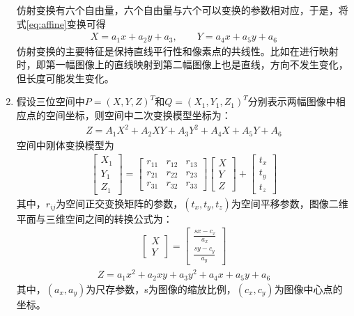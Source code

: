 \begin{enumerate}
仿射变换有六个自由量，六个自由量与六个可以变换的参数相对应，于是，将式\ref{eq:affine}变换可得
\begin{align}
X = a_1x + a_2y + a_3, 
\qquad
Y = a_4x + a_5y + a_6
\end{align}
仿射变换的主要特征是保持直线平行性和像素点的共线性。比如在进行映射时，即第一幅图像上的直线映射到第二幅图像上也是直线，方向不发生变化，但长度可能发生变化。
\item 假设三位空间中$P=(X, Y, Z)^T$和$Q=(X_1,Y_1,Z_1)^T$分别表示两幅图像中相应点的空间坐标，则空间中二次变换模型坐标为：
\begin{align}
Z = A_1X^2 + A_2XY + A_3Y^2 + A_4X + A_5Y + A_6
\label{eq:twice-4}
\end{align}
空间中刚体变换模型为
\begin{align}
\left[ \begin{array}{c}
X_1\\
Y_1\\
Z_1
\end{array} \right]
=
\left[ \begin{array}{ccc}
r_{11} & r_{12} & r_{13} \\
r_{21} & r_{22} & r_{23} \\
r_{31} & r_{32} & r_{33}
\end{array} \right]
\left[ \begin{array}{c}
X \\
Y \\
Z
\end{array} \right]
+
\left[ \begin{array}{c}
t_x \\
t_y \\
t_z
\end{array} \right]
\label{eq:twice-1}
\end{align}
其中，$r_{ij}$为空间正交变换矩阵的参数，$(t_x, t_y, t_z)$为空间平移参数，图像二维平面与三维空间之间的转换公式为：
\begin{align}
\left[ \begin{array}{c}
X \\
Y 
\end{array} \right]
=
\left[ \begin{array}{c}
\frac{sx-c_x}{a_x} \\
\frac{sy-c_y}{a_y}
\end{array} \right]
\label{eq:twice-2}
\end{align}
\begin{align}
Z = a_1x^2 + a_2xy + a_3y^2 + a_4x + a_5y + a_6
\label{eq:twice-3}
\end{align}
其中，$(a_x, a_y)$为尺存参数，s为图像的缩放比例，$(c_x, c_y)$为图像中心点的坐标。


\end{enumerate}
